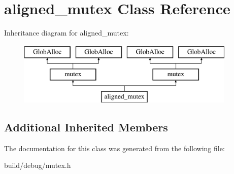 \hypertarget{classaligned__mutex}{\section{aligned\-\_\-mutex Class Reference}
\label{classaligned__mutex}
}
Inheritance diagram for aligned\-\_\-mutex\-:\begin{figure}[H]
\begin{center}
\leavevmode
\includegraphics[height=3.000000cm]{classaligned__mutex}
\end{center}
\end{figure}
\subsection*{Additional Inherited Members}


The documentation for this class was generated from the following file\-:\begin{DoxyCompactItemize}
\item 
build/debug/mutex.\-h\end{DoxyCompactItemize}
